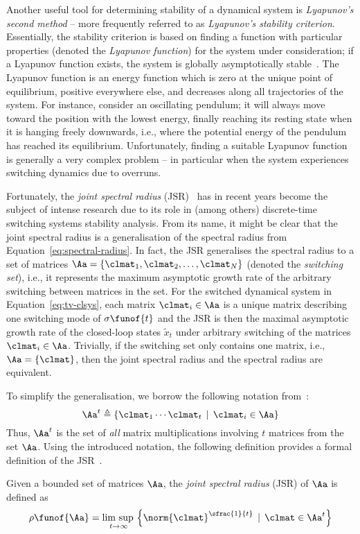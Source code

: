 Another useful tool for determining stability of a dynamical system is \emph{Lyapunov's second method} -- more frequently referred to as \emph{Lyapunov's stability criterion}.
Essentially, the stability criterion is based on finding a function with particular properties (denoted the \emph{Lyapunov function}) for the system under consideration; if a Lyapunov function exists, the system is globally asymptotically stable~\cite{Astrom:1997}.
The Lyapunov function is an energy function which is zero at the unique point of equilibrium, positive everywhere else, and decreases along all trajectories of the system.
For instance, consider an oscillating pendulum; it will always move toward the position with the lowest energy, finally reaching its resting state when it is hanging freely downwards, i.e., where the potential energy of the pendulum has reached its equilibrium.
Unfortunately, finding a suitable Lyapunov function is generally a very complex problem -- in particular when the system experiences switching dynamics due to overruns.

Fortunately, the \emph{joint spectral radius} (JSR)~\cite{Rota:1960} has in recent years become the subject of intense research due to its role in (among others) discrete-time switching systems stability analysis.
From its name, it might be clear that the joint spectral radius is a generalisation of the spectral radius from Equation~\eqref{eq:spectral-radius}.
In fact, the JSR generalises the spectral radius to a set of matrices $\Aa = \left\{ \clmat_1, \clmat_2, \ldots, \clmat_N \right\}$ (denoted the \emph{switching set}), i.e., it represents the maximum asymptotic growth rate of the arbitrary switching between matrices in the set.
For the switched dynamical system in Equation~\eqref{eq:tv-clsys}, each matrix $\clmat_i \in \Aa$ is a unique matrix describing one switching mode of $\sigma\funof{t}$ and the JSR is then the maximal asymptotic growth rate of the closed-loop states $\tilde{x}_t$ under arbitrary switching of the matrices $\clmat_i \in \Aa$.
Trivially, if the switching set only contains one matrix, i.e., $\Aa = \left\{ \clmat \right\}$, then the joint spectral radius and the spectral radius are equivalent.

To simplify the generalisation, we borrow the following notation from~\cite{Jungers:2009}:
%
\begin{equation}
    \Aa^t \triangleq \left\{ \clmat_1 \cdots \clmat_t \,\mid\, \clmat_i \in \Aa \right\}
\end{equation}
%
Thus, $\Aa^t$ is the set of \emph{all} matrix multiplications involving $t$ matrices from the set $\Aa$.
Using the introduced notation, the following definition provides a formal definition of the JSR~\cite{Jungers:2009}.
%
\begin{definition}%
    \label{def:jsr}%
    Given a bounded set of matrices $\Aa$, the \emph{joint spectral radius} (JSR) of $\Aa$ is defined as
    \begin{equation*}
        \rho\funof{\Aa} = \underset{t\rightarrow\infty}{\lim{}\sup{}} \left\{ \norm{\clmat}^{\sfrac{1}{t}} \,\mid\, \clmat \in \Aa^t \right\}
    \end{equation*}
\end{definition}

